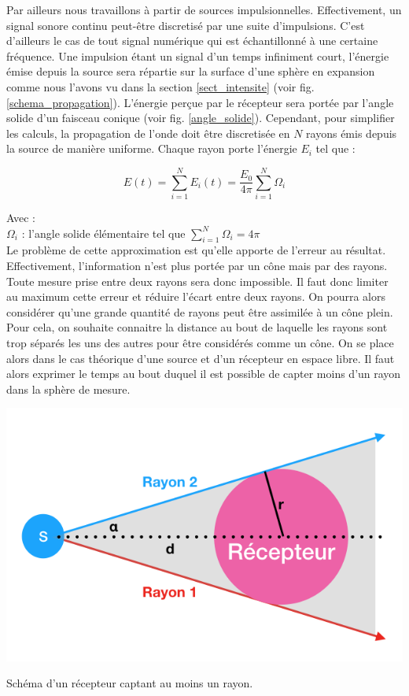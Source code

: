 Par ailleurs nous travaillons à partir de sources impulsionnelles. Effectivement, un signal sonore continu peut-être discretisé par une suite d'impulsions. C'est d'ailleurs le cas de tout signal numérique qui est échantillonné à une certaine fréquence. Une impulsion étant un signal d'un temps infiniment court, l'énergie émise depuis la source sera répartie sur la surface d'une sphère en expansion comme nous l'avons vu dans la section \ref{sect_intensite} (voir fig. \ref{schema_propagation}). L'énergie perçue par le récepteur sera portée par l'angle solide d'un faisceau conique (voir fig. \ref{angle_solide}). Cependant, pour simplifier les calculs, la propagation de l'onde doit être discretisée en $N$ rayons émis depuis la source de manière uniforme. Chaque rayon porte l'énergie $E_i$ tel que :

\begin{equation}
E(t) = \sum_{i=1}^N E_i(t) = \frac{E_0}{4\pi}  \sum_{i=1}^N \Omega_i
\end{equation}

Avec : \\
$\Omega_i$ : l'angle solide élémentaire tel que $ \sum_{i=1}^N \Omega_i = 4\pi$ \\



 Le problème de cette approximation est qu'elle apporte de l'erreur au résultat. Effectivement, l'information n'est plus portée par un cône mais par des rayons. Toute mesure prise entre deux rayons sera donc impossible. Il faut donc limiter au maximum cette erreur et réduire l'écart entre deux rayons. On pourra alors considérer qu'une grande quantité de rayons peut être assimilée à un cône plein. Pour cela, on souhaite connaitre la distance au bout de laquelle les rayons sont trop séparés les uns des autres pour être considérés comme un cône. On se place alors dans le cas théorique d'une source et d'un récepteur en espace libre. Il faut alors exprimer le temps au bout duquel il est possible de capter moins d'un rayon dans la sphère de mesure. 

\begin{figureth}
	\includegraphics[width=0.8\linewidth]{images/schema_rayon}
	\caption{Schéma d'un récepteur captant au moins un rayon.}
	\label{schema_rayon}
\end{figureth}

